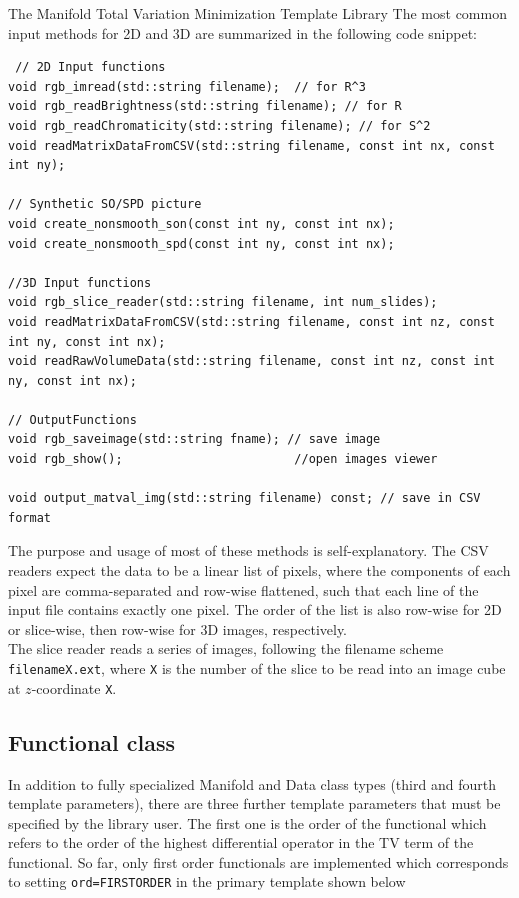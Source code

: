\begin{chapter}{The Manifold Total Variation Minimization Template Library}
The most common input methods for 2D and 3D are summarized in the following code snippet:
\cppinline
\begin{lstlisting}
 // 2D Input functions
void rgb_imread(std::string filename);	// for R^3
void rgb_readBrightness(std::string filename); // for R
void rgb_readChromaticity(std::string filename); // for S^2
void readMatrixDataFromCSV(std::string filename, const int nx, const int ny);

// Synthetic SO/SPD picture 
void create_nonsmooth_son(const int ny, const int nx);
void create_nonsmooth_spd(const int ny, const int nx);
 
//3D Input functions
void rgb_slice_reader(std::string filename, int num_slides); 
void readMatrixDataFromCSV(std::string filename, const int nz, const int ny, const int nx);
void readRawVolumeData(std::string filename, const int nz, const int ny, const int nx);

// OutputFunctions
void rgb_saveimage(std::string fname); // save image
void rgb_show();						//open images viewer
	
void output_matval_img(std::string filename) const; // save in CSV format
\end{lstlisting}
The purpose and usage of most of these methods is self-explanatory. The CSV readers expect the data to be a linear list of pixels, where the components of each pixel are
comma-separated and row-wise flattened, such that each line of the input file contains exactly one pixel. The order of the list is also row-wise for 2D or slice-wise, then row-wise for 3D images,
respectively. \\ 
The slice reader reads a series of images, following the filename scheme \texttt{filenameX.ext}, where \texttt{X} is the number of the slice to be read into an image cube at $z$-coordinate
\texttt{X}.

\subsection{Functional class} %
\label{sub:Functional class}
In addition to fully specialized Manifold and Data class types (third and fourth template parameters),
there are three further template parameters that must be specified by the library user. The first one
is the order of the functional which refers to the order of the highest differential operator in the TV term of the functional.
So far, only first order functionals are implemented which corresponds to setting \texttt{ord=FIRSTORDER} in the primary template shown below


\end{chapter}
